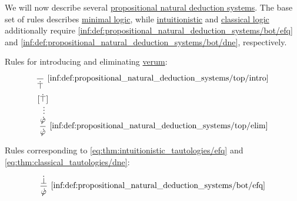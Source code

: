 \begin{definition}\label{def:propositional_natural_deduction_systems}
  We will now describe several \hyperref[def:propositional_natural_deduction_system]{propositional natural deduction systems}. The base set of rules describes \hyperref[def:minimal_logic]{minimal logic}, while \hyperref[def:intuitionistic_logic]{intuitionistic} and \hyperref[def:classical_logic]{classical logic} additionally require \ref{inf:def:propositional_natural_deduction_systems/bot/efq} and \ref{inf:def:propositional_natural_deduction_systems/bot/dne}, respectively.

  \begin{thmenum}
    \mimprovised Rules for introducing and eliminating \hyperref[def:propositional_alphabet/constants/verum]{verum}:
    \begin{TwoColumns}
      \begin{equation*}\taglabel[\( \top^+ \)]{inf:def:propositional_natural_deduction_systems/top/intro}
        \begin{prooftree}
          \infer0[\ref{inf:def:propositional_natural_deduction_systems/top/intro}]{ \syntop }
        \end{prooftree}
      \end{equation*}
    \BeginSecondColumn
      \begin{equation*}\taglabel[\( \top^- \)]{inf:def:propositional_natural_deduction_systems/top/elim}
        \begin{prooftree}
          \hypo{ [\syntop] }
          \ellipsis {} { \syn\varphi }
          \infer1[\ref{inf:def:propositional_natural_deduction_systems/top/elim}]{ \syn\varphi }
        \end{prooftree}
      \end{equation*}
    \end{TwoColumns}

     Rules corresponding to \eqref{eq:thm:intuitionistic_tautologies/efq} and \eqref{eq:thm:classical_tautologies/dne}:
    \begin{TwoColumns}
      \begin{equation*}\taglabel[\logic{EFQ}]{inf:def:propositional_natural_deduction_systems/bot/efq}
        \begin{prooftree}
          \hypo{ \synbot }
          \infer1[\ref{inf:def:propositional_natural_deduction_systems/bot/efq}]{ \syn\varphi }
        \end{prooftree}
      \end{equation*}


\end{TwoColumns}
\end{thmenum}
\end{definition}
